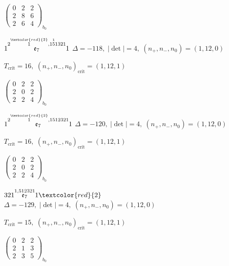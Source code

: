 \documentclass[10pt]{article}
\begin{document}
\hspace{2em}$\left(\begin{smallmatrix}0 & 2 & 2 \\ 2 & 8 & 6 \\ 2 & 6 & 4\end{smallmatrix}\right)_{\!b_0}$

\smallskip

$1\overset{2\overset{\textcolor{red}{2}}{1},1\overset{1}{5}1321}{\mathfrak{e}_7}1$ \quad $\Delta=-118,\; |\det|=4,\; (n_+,n_-,n_0)=(1,12,0)$

\hspace{1em}$T_{\text{crit}}=16,\; (n_+,n_-,n_0)_{\text{crit}}=(1,12,1)$

\hspace{2em}$\left(\begin{smallmatrix}0 & 2 & 2 \\ 2 & 0 & 2 \\ 2 & 2 & 4\end{smallmatrix}\right)_{\!b_0}$

\smallskip

$1\overset{2\overset{\textcolor{red}{2}}{1},1512321}{\mathfrak{e}_7}1$ \quad $\Delta=-120,\; |\det|=4,\; (n_+,n_-,n_0)=(1,12,0)$

\hspace{1em}$T_{\text{crit}}=16,\; (n_+,n_-,n_0)_{\text{crit}}=(1,12,1)$

\hspace{2em}$\left(\begin{smallmatrix}0 & 2 & 2 \\ 2 & 0 & 2 \\ 2 & 2 & 4\end{smallmatrix}\right)_{\!b_0}$

\smallskip

$321\overset{1,512321}{\mathfrak{e}_7}1\textcolor{red}{2}$ \quad $\Delta=-129,\; |\det|=4,\; (n_+,n_-,n_0)=(1,12,0)$

\hspace{1em}$T_{\text{crit}}=15,\; (n_+,n_-,n_0)_{\text{crit}}=(1,12,1)$

\hspace{2em}$\left(\begin{smallmatrix}0 & 2 & 2 \\ 2 & 1 & 3 \\ 2 & 3 & 5\end{smallmatrix}\right)_{\!b_0}$
\end{document}
